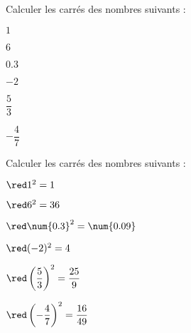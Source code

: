 \begin{exercice*}
    Calculer les carrés des nombres suivants :
    \begin{multicols}{3}
        \begin{enumerate}
            \begin{spacing}{1.5}
                \item $1$
                \item $6$
                \item $\num{0.3}$
                \item $-2$
                \item $\dfrac{5}{3}$
                \item $-\dfrac{4}{7}$
            \end{spacing}
        \end{enumerate}
    \end{multicols}

\end{exercice*}
\begin{corrige}
    Calculer les carrés des nombres suivants :
    \begin{multicols}{2}
        \begin{enumerate}
            \begin{spacing}{1.5}
                \item ${\red 1^2 = 1}$
                \item ${\red 6^2 = 36}$
                \item ${\red \num{0.3}^2 = \num{0.09}}$
                \item ${\red (-2)^2 = 4}$
                \item ${\red \left(\dfrac{5}{3}\right)^2 = \dfrac{25}{9}}$
                \item ${\red \left(-\dfrac{4}{7}\right)^2 = \dfrac{16}{49}}$
            \end{spacing}
        \end{enumerate}
    \end{multicols}
\end{corrige}

